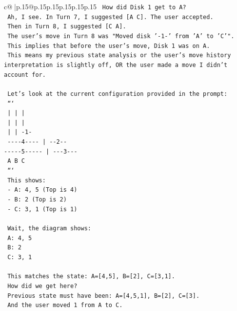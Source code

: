 \documentclass{article}
\begin{document}
{\begin{supertabular}{c@{$\;$}|p{.15\linewidth}@{}p{.15\linewidth}p{.15\linewidth}p{.15\linewidth}p{.15\linewidth}p{.15\linewidth}}
{{{\texttt{   How did Disk 1 get to A?} \\
\texttt{   Ah, I see. In Turn 7, I suggested {[}A C{]}. The user accepted.} \\
\texttt{   Then in Turn 8, I suggested {[}C A{]}.} \\
\texttt{   The user's move in Turn 8 was "Moved disk '{-}1{-}' from 'A' to 'C'".} \\
\texttt{   This implies that before the user's move, Disk 1 was on A.} \\
\texttt{   This means my previous state analysis or the user's move history interpretation is slightly off, OR the user made a move I didn't account for.} \\
\\ 
\texttt{   Let's look at the current configuration provided in the prompt:} \\
\texttt{   ```} \\
\texttt{     |           |           |     } \\
\texttt{     |           |           |     } \\
\texttt{     |           |          {-}1{-}    } \\
\texttt{ {-}{-}{-}{-}4{-}{-}{-}{-}       |         {-}{-}2{-}{-}   } \\
\texttt{{-}{-}{-}{-}{-}5{-}{-}{-}{-}{-}      |        {-}{-}{-}3{-}{-}{-}  } \\
\texttt{     A           B           C     } \\
\texttt{   ```} \\
\texttt{   This shows:} \\
\texttt{   {-} A: 4, 5 (Top is 4)} \\
\texttt{   {-} B: 2 (Top is 2)} \\
\texttt{   {-} C: 3, 1 (Top is 1)} \\
\\ 
\texttt{   Wait, the diagram shows:} \\
\texttt{   A: 4, 5} \\
\texttt{   B: 2} \\
\texttt{   C: 3, 1} \\
\\ 
\texttt{   This matches the state: A={[}4,5{]}, B={[}2{]}, C={[}3,1{]}.} \\
\texttt{   How did we get here?} \\
\texttt{   Previous state must have been: A={[}4,5,1{]}, B={[}2{]}, C={[}3{]}.} \\
\texttt{   And the user moved 1 from A to C.} \\
}}}
\end{supertabular}}
\end{document}
